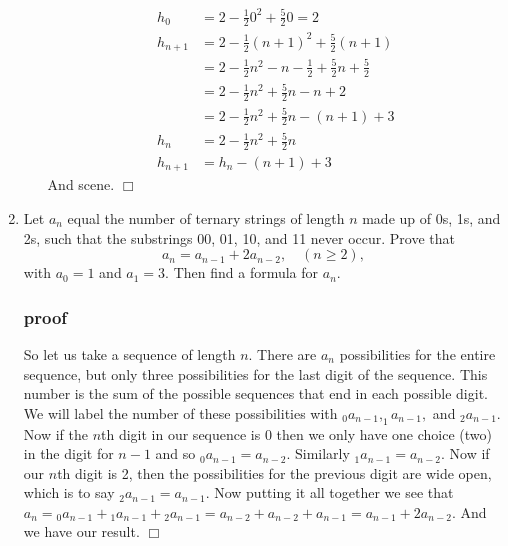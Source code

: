 \documentclass{article}
\begin{document}
\begin{enumerate}
\begin{enumerate}
    \begin{align*}
      h_0&=2-\frac{1}{2}0^2+\frac{5}{2}0=2\\
      h_{n+1}&=2-\frac{1}{2}(n+1)^2+\frac{5}{2}(n+1)\\
      &=2-\frac{1}{2}n^2-n-\frac{1}{2}+\frac{5}{2}n+\frac{5}{2}\\
      &=2-\frac{1}{2}n^2+\frac{5}{2}n-n+2\\
      &=2-\frac{1}{2}n^2+\frac{5}{2}n-(n+1)+3\\
      h_n&=2-\frac{1}{2}n^2+\frac{5}{2}n\\
      h_{n+1}&=h_n-(n+1)+3
    \end{align*}
    And scene. $\Box$
  \end{enumerate}
  \setcounter{enumi}{39}
  \item
  Let $a_n$ equal the number of ternary strings of length $n$ made up of 0s, 1s, and 2s, such that the substrings 00, 01, 10, and 11 never occur. Prove that
\[a_n=a_{n-1}+2a_{n-2},\quad(n\ge2),\]
  with $a_0=1$ and $a_1=3$. Then find a formula for $a_n$.
\subsubsection*{proof}
  So let us take a sequence of length $n$.
  There are $a_n$ possibilities for the entire sequence, but only three possibilities for the last digit of the sequence.
  This number is the sum of the possible sequences that end in each possible digit.
  We will label the number of these possibilities with $_0a_{n-1}, _1a_{n-1},$ and $_2a_{n-1}$.
  Now if the $n$th digit in our sequence is 0 then we only have one choice (two) in the digit for $n-1$ and so ${_0a_{n-1}}=a_{n-2}$.
  Similarly ${_1a_{n-1}}=a_{n-2}$.
  Now if our $n$th digit is 2, then the possibilities for the previous digit are wide open, which  is to say ${_2a_{n-1}}=a_{n-1}$.
  Now putting it all together we see that $a_n={_0a_{n-1}}+{_1a_{n-1}}+{_2a_{n-1}}=a_{n-2}+a_{n-2}+a_{n-1}=a_{n-1}+2a_{n-2}$.
  And we have our result.
  $\Box$

\end{enumerate}
\end{document}
